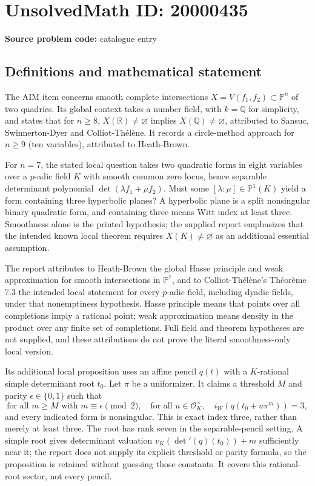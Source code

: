 \documentclass[11pt]{article}
\newcommand{\Q}{\mathbb{Q}}
\newcommand{\R}{\mathbb{R}}
\newcommand{\PP}{\mathbb{P}}
\begin{document}
\section*{UnsolvedMath ID: 20000435}
\textbf{Source problem code:} catalogue entry
\subsection{Definitions and mathematical statement}
The AIM item concerns smooth complete intersections $X=V(f_1,f_2)\subset\PP^n$ of two quadrics. Its global context takes a number field, with $k=\Q$ for simplicity, and states that for $n\geq8$, $X(\R)\ne\varnothing$ implies $X(\Q)\ne\varnothing$, attributed to Sansuc, Swinnerton-Dyer and Colliot-Th\'el\`ene. It records a circle-method approach for $n\geq9$ (ten variables), attributed to Heath-Brown.

For $n=7$, the stated local question takes two quadratic forms in eight variables over a $p$-adic field $K$ with smooth common zero locus, hence separable determinant polynomial $\det(\lambda f_1+\mu f_2)$. Must some $[\lambda:\mu]\in\PP^1(K)$ yield a form containing three hyperbolic planes? A hyperbolic plane is a split nonsingular binary quadratic form, and containing three means Witt index at least three. Smoothness alone is the printed hypothesis; the supplied report emphasizes that the intended known local theorem requires $X(K)\ne\varnothing$ as an additional essential assumption.

The report attributes to Heath-Brown the global Hasse principle and weak approximation for smooth intersections in $\PP^7$, and to Colliot-Th\'el\`ene's Th\'eor\`eme 7.3 the intended local statement for every $p$-adic field, including dyadic fields, under that nonemptiness hypothesis. Hasse principle means that points over all completions imply a rational point; weak approximation means density in the product over any finite set of completions. Full field and theorem hypotheses are not supplied, and these attributions do not prove the literal smoothness-only local version.

Its additional local proposition uses an affine pencil $q(t)$ with a $K$-rational simple determinant root $t_0$. Let $\pi$ be a uniformizer. It claims a threshold $M$ and parity $\epsilon\in\{0,1\}$ such that
\[
 \text{for all }m\geq M\text{ with }m\equiv\epsilon\pmod2,
 \quad\text{for all }u\in\mathcal O_K^\times,
 \quad i_W(q(t_0+u\pi^m))=3,
\]
and every indicated form is nonsingular. This is exact index three, rather than merely at least three. The root has rank seven in the separable-pencil setting. A simple root gives determinant valuation $v_K(\det'(q)(t_0))+m$ sufficiently near it; the report does not supply its explicit threshold or parity formula, so the proposition is retained without guessing those constants. It covers this rational-root sector, not every pencil.
\end{document}
